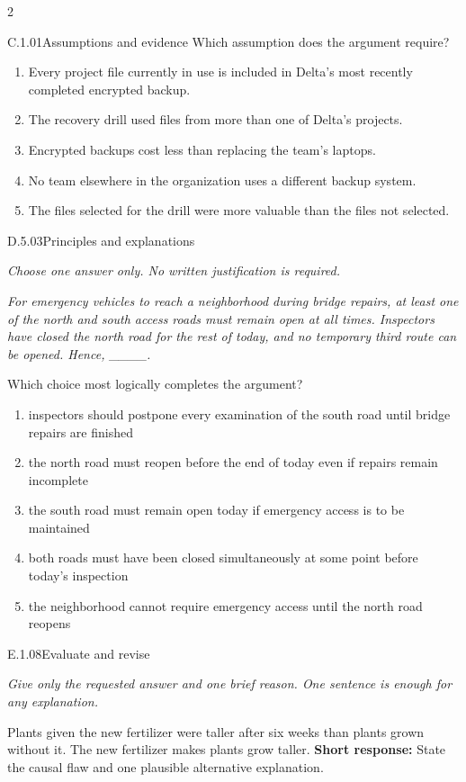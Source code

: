 \documentclass[9pt]{extarticle}
\newcommand{\choice}[1]{\item #1}
\begin{document}
\begin{multicols}{2}
\begin{DenseCoreProblem}{C.1.01}{Assumptions and evidence}
Which assumption does the argument require?
\begin{enumerate}[label=(\alph*)]
  \choice{Every project file currently in use is included in Delta's most recently completed encrypted backup.}
  \choice{The recovery drill used files from more than one of Delta's projects.}
  \choice{Encrypted backups cost less than replacing the team's laptops.}
  \choice{No team elsewhere in the organization uses a different backup system.}
  \choice{The files selected for the drill were more valuable than the files not selected.}
\end{enumerate}
\end{DenseCoreProblem}
\begin{DenseCoreProblem}{D.5.03}{Principles and explanations}
{\scriptsize\textit{Choose one answer only. No written justification is required.}\par}
\emph{For emergency vehicles to reach a neighborhood during bridge repairs, at least one of the north and south access roads must remain open at all times. Inspectors have closed the north road for the rest of today, and no temporary third route can be opened. Hence, \_\_\_\_.}

Which choice most logically completes the argument?
\begin{enumerate}[label=(\alph*)]
  \choice{inspectors should postpone every examination of the south road until bridge repairs are finished}
  \choice{the north road must reopen before the end of today even if repairs remain incomplete}
  \choice{the south road must remain open today if emergency access is to be maintained}
  \choice{both roads must have been closed simultaneously at some point before today's inspection}
  \choice{the neighborhood cannot require emergency access until the north road reopens}
\end{enumerate}
\end{DenseCoreProblem}
\begin{DenseCoreProblem}{E.1.08}{Evaluate and revise}
{\scriptsize\textit{Give only the requested answer and one brief reason. One sentence is enough for any explanation.}\par}
Plants given the new fertilizer were taller after six weeks than plants grown without it. The new fertilizer makes plants grow taller.
\textbf{Short response:} State the causal flaw and one plausible alternative explanation.
\end{DenseCoreProblem}
\end{multicols}
\CoreWorkArea
\FormBreak
{}
\end{document}
